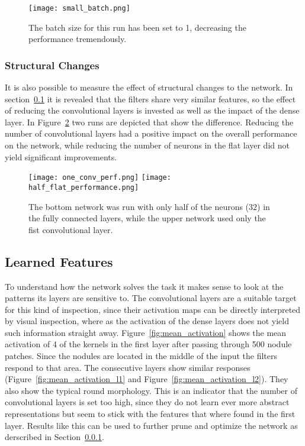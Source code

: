 \documentclass[main.tex]{subfiles}
\begin{document}
\begin{figure}[H]
\begin{center}
\texttt{[image: small\_batch.png]}
\end{center}
\caption{The batch size for this run has been set to 1, decreasing the performance tremendously.}
\label{fig:small_batch}
\end{figure}

\subsubsection{Structural Changes}\label{sss:struct_changes}
 
It is also possible to measure the effect of structural changes to the network. In section~\ref{ss:features} it is revealed that the filters share very similar features, so the effect of reducing the convolutional layers is invested as well as the impact of the dense layer. In Figure~\ref{fig:structure_change} two runs are depicted that show the difference. Reducing the number of convolutional layers had a positive impact on the overall performance on the network, while reducing the number of neurons in the flat layer did not yield significant improvements.


\begin{figure}[H]
\begin{center}
\texttt{[image: one\_conv\_perf.png]}
\texttt{[image: half\_flat\_performance.png]}
\end{center}
\caption{The bottom network was run with only half of the neurons ($32$) in the fully connected layers, while the upper network used only the fist convolutional layer.}
\label{fig:structure_change}
\end{figure}


\subsection{Learned Features}\label{ss:features}
To understand how the network solves the task it makes sense to look at the patterns its layers are sensitive to. The convolutional layers are a suitable target for this kind of inspection, since their activation maps can be directly interpreted by visual inspection, where as the activation of the dense layers does not yield such information straight away. Figure~\ref{fig:mean_activation} shows the mean activation of 4 of the kernels in the first layer after passing through 500 nodule patches. Since the nodules are located in the middle of the input the filters respond to that area. The consecutive layers show similar responses (Figure~\ref{fig:mean_activation_l1} and Figure~\ref{fig:mean_activation_l2}). They also show the typical round morphology. This is an indicator that the number of convolutional layers is set too high, since they do not learn ever more abstract representations but seem to stick with the features that where found in the first layer. Results like this can be used to further prune and optimize the network as derscribed in Section~\ref{sss:struct_changes}.
\end{document}
